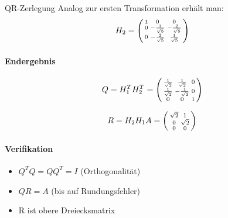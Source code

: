 \begin{example2}{QR-Zerlegung}
Analog zur ersten Transformation erhält man:
$$H_2 = \begin{psmallmatrix}
1 & 0 & 0\\
0 & -\frac{1}{\sqrt{5}} & -\frac{2}{\sqrt{5}}\\
0 & -\frac{2}{\sqrt{5}} & \frac{1}{\sqrt{5}}
\end{psmallmatrix}$$

\paragraph{Endergebnis}
$$Q = H_1^TH_2^T = \begin{psmallmatrix}
\frac{1}{\sqrt{2}} & \frac{1}{\sqrt{2}} & 0\\
\frac{1}{\sqrt{2}} & -\frac{1}{\sqrt{2}} & 0\\
0 & 0 & 1
\end{psmallmatrix}$$

$$R = H_2H_1A = \begin{psmallmatrix}
\sqrt{2} & 1\\
0 & \sqrt{2}\\
0 & 0
\end{psmallmatrix}$$

\paragraph{Verifikation}
\begin{itemize}
    \item $Q^TQ = QQ^T = I$ (Orthogonalität)
    \item $QR = A$ (bis auf Rundungsfehler)
    \item R ist obere Dreiecksmatrix
\end{itemize}
\end{example2}

